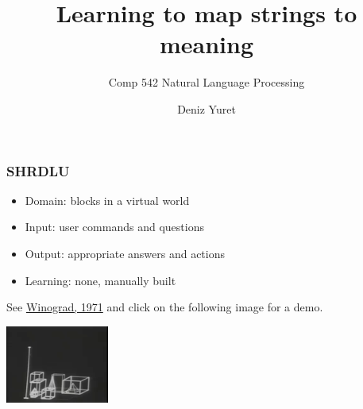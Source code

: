 \documentclass[ignorenonframetext]{beamer}
\title{Learning to map strings to meaning}
\subtitle{Comp 542 Natural Language Processing}
\author{Deniz Yuret}
\begin{document}
\begin{frame}
\maketitle
\end{frame}

\begin{frame}\frametitle{SHRDLU}

\begin{itemize}
\item Domain: blocks in a virtual world
\item Input: user commands and questions
\item Output: appropriate answers and actions
\item Learning: none, manually built
\end{itemize}

See \href{http://hci.stanford.edu/~winograd/shrdlu}{Winograd, 1971}
and click on the following image for a demo.

\begin{center}
\href{http://youtu.be/QAJz4YKUwqw}{
\includegraphics[]{images/winograd-shrdlu.png}}
\end{center}

\end{frame}
\end{document}
